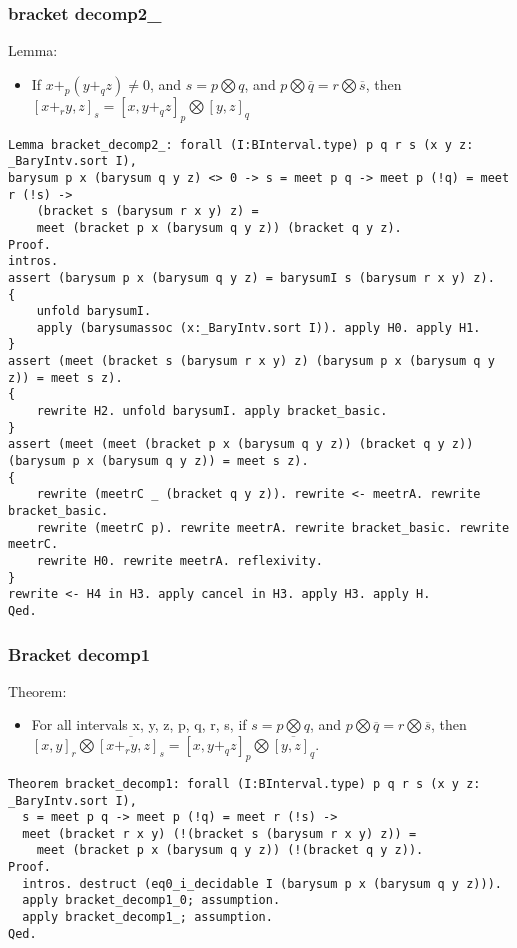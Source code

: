 \documentclass[a4paper,10pt]{article} %
\begin{document}
\subsubsection{bracket decomp2\_}
Lemma:
\begin{itemize}
    \item If $x + _p(y + _qz) \neq 0$, and $s = p \bigotimes q$, and $p \bigotimes \overline{q} = r \bigotimes \overline{s}$, then $[x + _ry, z]_s = [x, y + _qz]_p \bigotimes [y, z]_q$
\end{itemize}
\begin{lstlisting}
Lemma bracket_decomp2_: forall (I:BInterval.type) p q r s (x y z: _BaryIntv.sort I),
barysum p x (barysum q y z) <> 0 -> s = meet p q -> meet p (!q) = meet r (!s) ->  
    (bracket s (barysum r x y) z) = 
    meet (bracket p x (barysum q y z)) (bracket q y z).
Proof.
intros.
assert (barysum p x (barysum q y z) = barysumI s (barysum r x y) z).
{
    unfold barysumI.
    apply (barysumassoc (x:_BaryIntv.sort I)). apply H0. apply H1.
} 
assert (meet (bracket s (barysum r x y) z) (barysum p x (barysum q y z)) = meet s z).
{
    rewrite H2. unfold barysumI. apply bracket_basic.
}
assert (meet (meet (bracket p x (barysum q y z)) (bracket q y z)) (barysum p x (barysum q y z)) = meet s z).
{
    rewrite (meetrC _ (bracket q y z)). rewrite <- meetrA. rewrite bracket_basic.
    rewrite (meetrC p). rewrite meetrA. rewrite bracket_basic. rewrite meetrC. 
    rewrite H0. rewrite meetrA. reflexivity.
}
rewrite <- H4 in H3. apply cancel in H3. apply H3. apply H.
Qed.
\end{lstlisting}

\subsubsection{Bracket decomp1}
Theorem:
\begin{itemize}
    \item For all intervals x, y, z, p, q, r, s, if $s = p \bigotimes q$, and $p \bigotimes \overline{q} = r \bigotimes \overline{s}$, then $[x, y]_r \bigotimes\overline{[x + _ry, z]_s} = [x, y + _qz]_p \bigotimes \overline{[y, z]_q}$.
\end{itemize}
\begin{lstlisting}
Theorem bracket_decomp1: forall (I:BInterval.type) p q r s (x y z: _BaryIntv.sort I),
  s = meet p q -> meet p (!q) = meet r (!s) ->  
  meet (bracket r x y) (!(bracket s (barysum r x y) z)) = 
    meet (bracket p x (barysum q y z)) (!(bracket q y z)).
Proof.
  intros. destruct (eq0_i_decidable I (barysum p x (barysum q y z))).
  apply bracket_decomp1_0; assumption.
  apply bracket_decomp1_; assumption.
Qed.
\end{lstlisting}
\end{document}
